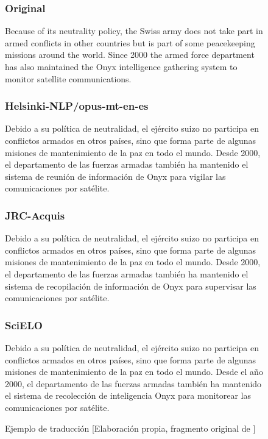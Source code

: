 \begin{figure}[H]
\subsubsection{Original}
\begin{spverbatim}
Because of its neutrality policy, the Swiss army does not take part in armed conflicts in other countries but is part of some peacekeeping missions around the world. Since 2000 the armed force department has also maintained the Onyx intelligence gathering system to monitor satellite communications.
\end{spverbatim}

\subsubsection{Helsinki-NLP/opus-mt-en-es}
\begin{spverbatim}
Debido a su política de neutralidad, el ejército suizo no participa en conflictos armados en otros países, sino que forma parte de algunas misiones de mantenimiento de la paz en todo el mundo. Desde 2000, el departamento de las fuerzas armadas también ha mantenido el sistema de reunión de información de Onyx para vigilar las comunicaciones por satélite.
\end{spverbatim}

\subsubsection{JRC-Acquis}
\begin{spverbatim}
Debido a su política de neutralidad, el ejército suizo no participa en conflictos armados en otros países, sino que forma parte de algunas misiones de mantenimiento de la paz en todo el mundo. Desde 2000, el departamento de las fuerzas armadas también ha mantenido el sistema de recopilación de información de Onyx para supervisar las comunicaciones por satélite.
\end{spverbatim}

\subsubsection{SciELO}
\begin{spverbatim}
Debido a su política de neutralidad, el ejército suizo no participa en conflictos armados en otros países, sino que forma parte de algunas misiones de mantenimiento de la paz en todo el mundo. Desde el año 2000, el departamento de las fuerzas armadas también ha mantenido el sistema de recolección de inteligencia Onyx para monitorear las comunicaciones por satélite.
\end{spverbatim}
\caption{Ejemplo de traducción [Elaboración propia, fragmento original de \cite{ContributorstoWikimediaprojects2022Jan}]}\label{ejemplotranslate}
\end{figure}

